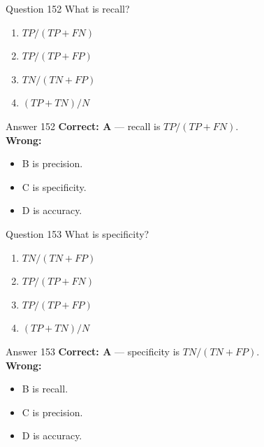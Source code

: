 \documentclass[aspectratio=169,11pt]{beamer}
\begin{document}
	\begin{frame}{Question 152}
		What is recall?
		\begin{enumerate}[label=\Alph*.]
			\item $TP/(TP+FN)$
			\item $TP/(TP+FP)$
			\item $TN/(TN+FP)$
			\item $(TP+TN)/N$
		\end{enumerate}
	\end{frame}
	\begin{frame}{Answer 152}
		\textbf{Correct: A} --- recall is $TP/(TP+FN)$.\\
		\vspace{0.5em}
		\textbf{Wrong:}
		\begin{itemize}
			\item B is precision.
			\item C is specificity.
			\item D is accuracy.
		\end{itemize}
	\end{frame}
	
	\begin{frame}{Question 153}
		What is specificity?
		\begin{enumerate}[label=\Alph*.]
			\item $TN/(TN+FP)$
			\item $TP/(TP+FN)$
			\item $TP/(TP+FP)$
			\item $(TP+TN)/N$
		\end{enumerate}
	\end{frame}
	\begin{frame}{Answer 153}
		\textbf{Correct: A} --- specificity is $TN/(TN+FP)$.\\
		\vspace{0.5em}
		\textbf{Wrong:}
		\begin{itemize}
			\item B is recall.
			\item C is precision.
			\item D is accuracy.
		\end{itemize}
	\end{frame}
	
\end{document}

